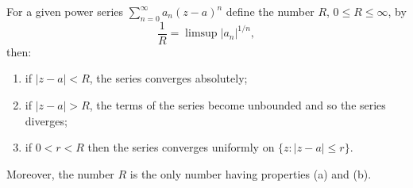 For a given power series $\sum_{n=0}^{\infty} a_n(z-a)^n$ define the number $R$, $0 \leq R \leq \infty$, by
$$\frac{1}{R} = \limsup |a_n|^{1/n},$$
then:

\begin{enumerate}
    \item[(a)] if $|z-a| < R$, the series converges absolutely;
    \item[(b)] if $|z-a| > R$, the terms of the series become unbounded and so the series diverges;
    \item[(c)] if $0 < r < R$ then the series converges uniformly on $\{z: |z-a| \leq r\}$.
\end{enumerate}

Moreover, the number $R$ is the only number having properties (a) and (b).
